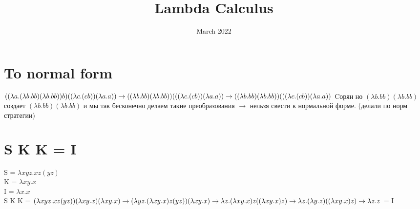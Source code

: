 \documentclass{article}
\title{Lambda Calculus}
\date{March 2022}
\begin{document}
\maketitle

\section{To normal form}
$((\lambda a.(\lambda b.b b) (\lambda b.b b)) b) ((\lambda c.(c b)) (\lambda a.a)) \to
((\lambda b.b b) (\lambda b.b b)) (((\lambda c.(c b)) (\lambda a.a)) \to
((\lambda b.b b) (\lambda b.b b)) (((\lambda c.(c b)) (\lambda a.a)) \\$
Cорян но $(\lambda b.b b) (\lambda b.b b)$ создает $(\lambda b.b b) (\lambda b.b b)$ и мы так бесконечно делаем такие преобразования $\to$ нельзя свести к нормальной форме. (делали по норм стратегии) 

\section{S K K = I}
S = $ \lambda x y z. x z (y z)$ \\
K = $\lambda x y. x$ \\
I = $\lambda x. x$ \\
S K K = $(\lambda x y z. x z (y z))(\lambda x y. x) (\lambda x y. x) \to \\
(\lambda yz. (\lambda xy.x) z (y z))(\lambda x y. x) \to \\
\lambda z. (\lambda xy.x) z ((\lambda xy.x) z) \to \\
\lambda z. (\lambda y. z) ((\lambda xy.x) z) \to \\
\lambda z. z
$ = I
\end{document}
